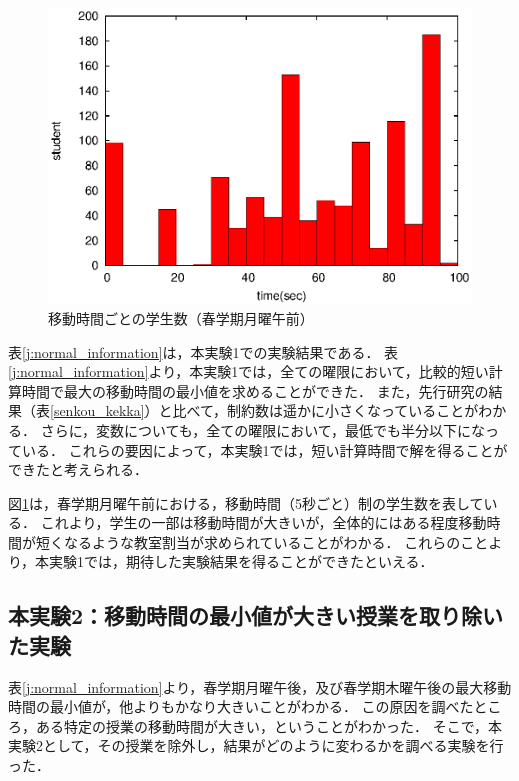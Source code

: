 \documentclass[12pt, a4paper, fleqn]{jreport}
\begin{document}
\begin{figure}[thpb]
 \begin{center}
 \hspace{5mm} 
\includegraphics[bb=0 0 390 248,clip,scale=1.0]{oMo12_hist.eps}
 \hspace{-10mm} 
\vspace{-5mm}
  \caption{移動時間ごとの学生数（春学期月曜午前）}
  \label{omo12}
 \end{center}
\end{figure}

表\ref{j:normal_information}は，本実験1での実験結果である．
表\ref{j:normal_information}より，本実験1では，全ての曜限において，比較的短い計算時間で最大の移動時間の最小値を求めることができた．
また，先行研究の結果（表\ref{senkou_kekka}）と比べて，制約数は遥かに小さくなっていることがわかる．
さらに，変数についても，全ての曜限において，最低でも半分以下になっている．
これらの要因によって，本実験1では，短い計算時間で解を得ることができたと考えられる．

図\ref{omo12}は，春学期月曜午前における，移動時間（5秒ごと）制の学生数を表している．
これより，学生の一部は移動時間が大きいが，全体的にはある程度移動時間が短くなるような教室割当が求められていることがわかる．
これらのことより，本実験1では，期待した実験結果を得ることができたといえる．

\subsection{本実験2：移動時間の最小値が大きい授業を取り除いた実験}
表\ref{j:normal_information}より，春学期月曜午後，及び春学期木曜午後の最大移動時間の最小値が，他よりもかなり大きいことがわかる．
この原因を調べたところ，ある特定の授業の移動時間が大きい，ということがわかった．
そこで，本実験2として，その授業を除外し，結果がどのように変わるかを調べる実験を行った．
\end{document}
